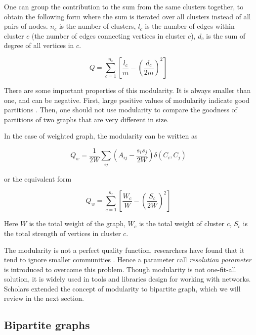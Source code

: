One can group the contribution to the sum from the same clusters together,
to obtain the following form where the sum is iterated over all clusters instead of all pairs of nodes.
$n_c$ is the number of clusters, $l_c$ is the number of edges within cluster $c$ (the number of edges connecting vertices in cluster $c$),
$d_c$ is the sum of degree of all vertices in $c$.


\begin{equation}
	Q = \sum_{c=1}^{n_c} \left[\frac{l_c}{m} - \left(\frac{d_c}{2m}\right)^2 \right]
\end{equation}

There are some important properties of this modularity.
It is always smaller than one, and can be negative.
First, large positive values of modularity indicate good partitions \parencite{fortunato2010}.
Then, one should not use modularity to compare the goodness of partitions of two graphs that are very different in size.

In the case of weighted graph, the modularity can be written as

\begin{equation}
	Q_w = \frac{1}{2W} \sum_{ij} \left(A_{ij} - \frac{s_i s_j}{2W}\right) \delta(C_i, C_j)
\end{equation}

or the equivalent form

\begin{equation}
	Q_w = \sum_{c=1}^{n_c} \left[\frac{W_c}{W} - \left(\frac{S_c}{2W}\right)^2 \right]
\end{equation}

Here $W$ is the total weight of the graph, $W_c$ is the total weight of cluster $c$,
$S_c$ is the total strength of vertices in cluster $c$.


The modularity is not a perfect quality function, researchers have found that it tend to ignore smaller communities \parencite{fortunato2007}.
Hence a parameter call \textit{resolution parameter} is introduced to overcome this problem.
Though modularity is not one-fit-all solution,
it is widely used in tools and libraries design for working with networks.
Scholars extended the concept of modularity to bipartite graph, which we will review in the next section.

\subsection{Bipartite graphs}

